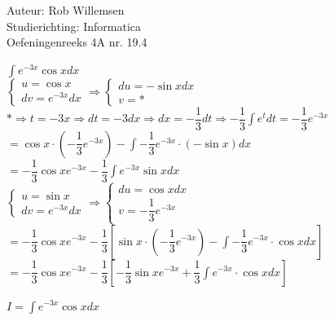 \documentclass[a4paper]{article}
\newcommand{\dint}{\displaystyle\int}
\begin{document}
\noindent \large Auteur: Rob Willemsen \\
\noindent \large Studierichting: Informatica \\
\noindent \large Oefeningenreeks 4A nr. 19.4 \\

\medskip

\normalsize

$\dint e^{-3x} \cos x dx$ \\

$ \left\{
\begin{array}{l}
u = \cos x \\
dv = e^{-3x} dx
\end{array} \right.
\Rightarrow
\left\{
\begin{array}{l}
du = -\sin x dx \\
v = *
\end{array} 
\right.$ \\

$* \Rightarrow t = -3x \Rightarrow dt = -3 dx \Rightarrow dx = -\dfrac{1}{3} dt \Rightarrow -\dfrac{1}{3} \dint e^t dt = -\dfrac{1}{3} e^{-3x}$ \\

$= \cos x \cdot \left(-\dfrac{1}{3} e^{-3x}\right) - \dint -\dfrac{1}{3} e^{-3x} \cdot (-\sin x) dx$ \\

$= -\dfrac{1}{3}\cos x e^{-3x}  - \dfrac{1}{3} \dint e^{-3x} \sin x dx$ \\

$ \left\{
\begin{array}{l}
u = \sin x \\
dv = e^{-3x} dx
\end{array} \right.
\Rightarrow
\left\{
\begin{array}{l}
du = \cos x dx \\
v = -\dfrac{1}{3} e^{-3x}
\end{array} 
\right.$ \\

$= -\dfrac{1}{3}\cos x e^{-3x}  - \dfrac{1}{3} \left[ \sin x \cdot \left(-\dfrac{1}{3} e^{-3x}\right) - \dint -\dfrac{1}{3} e^{-3x} \cdot \cos x dx \right]$ \\

$= -\dfrac{1}{3}\cos x e^{-3x}  - \dfrac{1}{3} \left[ -\dfrac{1}{3} \sin x e^{-3x} + \dfrac{1}{3} \dint e^{-3x} \cdot \cos x dx \right]$

$I = \dint e^{-3x} \cos x dx$ \\
\end{document}
